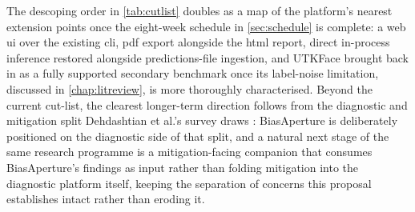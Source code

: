 The descoping order in \cref{tab:cutlist} doubles as a map of the platform's nearest extension points once the eight-week schedule in \cref{sec:schedule} is complete: a web \gls{ui} over the existing \gls{cli}, \gls{pdf} export alongside the \gls{html} report, direct in-process inference restored alongside predictions-file ingestion, and UTKFace brought back in as a fully supported secondary benchmark once its label-noise limitation, discussed in \cref{chap:litreview}, is more thoroughly characterised. Beyond the current cut-list, the clearest longer-term direction follows from the diagnostic and mitigation split Dehdashtian et al.'s survey draws \cite{dehdashtian2024survey}: BiasAperture is deliberately positioned on the diagnostic side of that split, and a natural next stage of the same research programme is a mitigation-facing companion that consumes BiasAperture's findings as input rather than folding mitigation into the diagnostic platform itself, keeping the separation of concerns this proposal establishes intact rather than eroding it.
